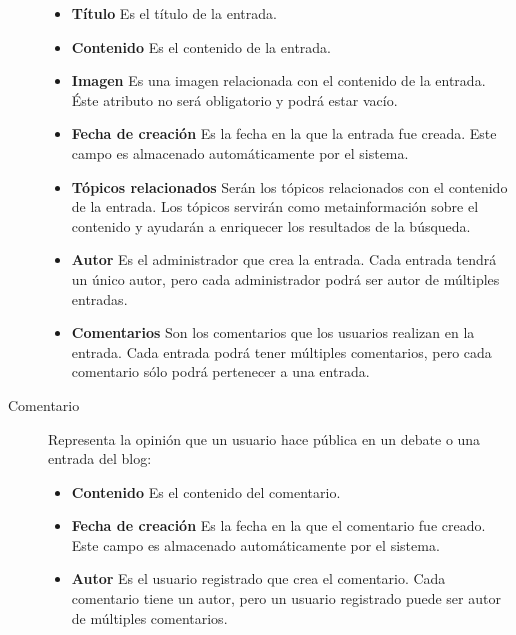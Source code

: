 \begin{description}
							\begin{itemize}
							\item \textbf{Título}  Es el título de la entrada.
							\item \textbf{Contenido}  Es el contenido de la entrada.
							\item \textbf{Imagen}  Es una imagen relacionada con el contenido de la entrada.  Éste atributo no será obligatorio y podrá estar vacío.
							\item \textbf{Fecha de creación}  Es la fecha en la que la entrada fue creada.  Este campo es almacenado automáticamente por el sistema.
							\item \textbf{Tópicos relacionados}  Serán los tópicos relacionados con el contenido de la entrada.  Los tópicos servirán como metainformación sobre el contenido y ayudarán a enriquecer los resultados de la búsqueda.
							\item \textbf{Autor}  Es el administrador que crea la entrada.  Cada entrada tendrá un único autor, pero cada administrador podrá ser autor de múltiples entradas.
							\item \textbf{Comentarios}  Son los comentarios que los usuarios realizan en la entrada.  Cada entrada podrá tener múltiples comentarios, pero cada comentario sólo podrá pertenecer a una entrada.
							\end{itemize}
\item[Comentario]  Representa la opinión que un usuario hace pública en un debate o una entrada del blog:
							\begin{itemize}
							\item \textbf{Contenido}  Es el contenido del comentario.
							\item \textbf{Fecha de creación}  Es la fecha en la que el comentario fue creado.  Este campo es almacenado automáticamente por el sistema.
							\item \textbf{Autor}  Es el usuario registrado que crea el comentario.  Cada comentario tiene un autor, pero un usuario registrado puede ser autor de múltiples comentarios.
							\end{itemize}
\end{description}